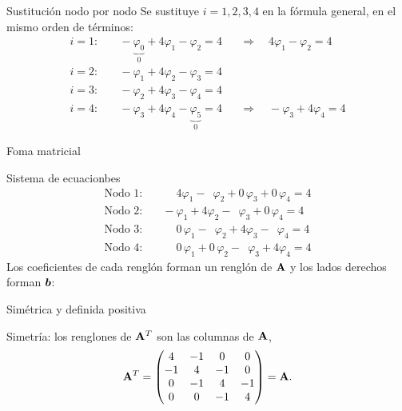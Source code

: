 Sustitución nodo por nodo
Se sustituye $i = 1, 2, 3, 4$ en la fórmula general, en el mismo orden de términos:
\begin{align*}
	i = 1:&\quad -\underbrace{\varphi_0}_{0} + 4\varphi_1 - \varphi_2 = 4
	&&\Longrightarrow\quad 4\varphi_1 - \varphi_2 = 4\\
	i = 2:&\quad -\varphi_1 + 4\varphi_2 - \varphi_3 = 4
	&&\\
	i = 3:&\quad -\varphi_2 + 4\varphi_3 - \varphi_4 = 4
	&&\\
	i = 4:&\quad -\varphi_3 + 4\varphi_4 - \underbrace{\varphi_5}_{0} = 4
	&&\Longrightarrow\quad -\varphi_3 + 4\varphi_4 = 4
\end{align*}

Foma matricial

Sistema de ecuacionbes
\begin{align*}
	\text{Nodo 1:}&\quad \phantom{-}4\varphi_1 - \phantom{4}\varphi_2 + 0\,\varphi_3 + 0\,\varphi_4 = 4\\
	\text{Nodo 2:}&\quad -\varphi_1 + 4\varphi_2 - \phantom{4}\varphi_3 + 0\,\varphi_4 = 4\\
	\text{Nodo 3:}&\quad \phantom{-}0\,\varphi_1 - \phantom{4}\varphi_2 + 4\varphi_3 - \phantom{4}\varphi_4 = 4\\
	\text{Nodo 4:}&\quad \phantom{-}0\,\varphi_1 + 0\,\varphi_2 - \phantom{4}\varphi_3 + 4\varphi_4 = 4
\end{align*}
Los coeficientes de cada renglón forman un renglón de $\mathbf{A}$ y los lados derechos forman $\bm{b}$:

Simétrica y definida positiva

Simetría: los renglones de $\mathbf{A}^T$ son las columnas de $\mathbf{A}$,
\[
\mathbf{A}^T =
\begin{pmatrix} 4 & -1 & 0 & 0\\ -1 & 4 & -1 & 0\\ 0 & -1 & 4 & -1\\ 0 & 0 & -1 & 4 \end{pmatrix}
= \mathbf{A}.
\]

